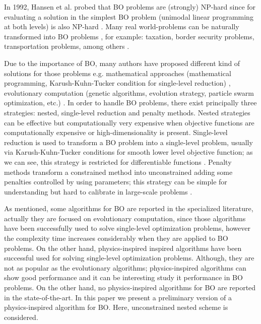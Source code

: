 \documentclass[conference]{IEEEtran}
\begin{document}
In 1992, Hansen et al. probed that BO problems are (strongly) NP-hard since for
evaluating a solution in the simplest BO problem (unimodal linear programming at
both levels) is also NP-hard \cite{hansen1992new,vicente1994descent}. Many real
world-problems can be naturally transformed into  BO problems \cite{sinha2018review},
for example: taxation, border security problems, transportation problems, among
others \cite{arroyo2010bilevel,bard2013practical,sinha2018review}.

Due to the importance of BO, many authors have proposed different kind of solutions
for those problems e.g. mathematical approaches (mathematical programming,
Karush-Kuhn-Tucker condition for single-level reduction) \cite{shi2005extended,dempe2002foundations},
evolutionary computation (genetic algorithms, evolution strategy, particle swarm
optimization, etc.) \cite{derrac2011practical,angelo2013differential,sinha2012unconstrained}.
In order to handle BO problems, there exist principally three strategies: nested,
single-level reduction and penalty methods. Nested strategies can be effective but
computationally very expensive when objective functions are computationally
expensive or high-dimensionality is present. Single-level reduction is used to
transform a BO problem into a single-level problem, usually via Karush-Kuhn-Tucker
conditions for smooth lower level objective function; as we can see, this strategy
is restricted for differentiable functions \cite{dempe2002foundations,colson2007overview}.
Penalty methods transform a constrained method into unconstrained adding some
penalties controlled by using parameters; this strategy can be simple for understanding
but hard to calibrate in large-scale problems \cite{savard1994steepest,white1993penalty}.

As mentioned, some algorithms for BO are reported in the specialized literature,
actually they are focused on evolutionary computation, since those algorithms have
been successfully used to solve single-level optimization problems, however the
complexity time increases considerably when they are applied to BO problems. On
the other hand, physics-inspired inspired algorithms have been successful used
for solving single-level optimization problems. Although, they are not as popular
as the evolutionary algorithms; physics-inspired algorithms can show good performance
and it can be interesting study it performance in BO problems. On the other hand,
no physics-inspired algorithms for BO are reported in the state-of-the-art. In this
paper we present a preliminary version of a physics-inspired algorithm for BO. Here,
unconstrained nested scheme is considered.
\end{document}
